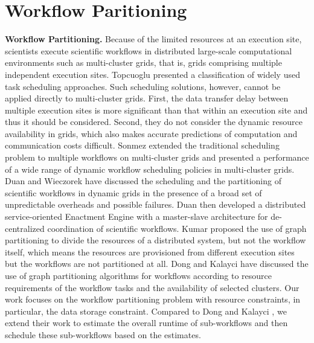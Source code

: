 \section{Workflow Paritioning}



\textbf{Workflow Partitioning.} Because of the limited resources at an execution site, scientists execute scientific workflows \cite{Bharathi2008, Rubing2005} in distributed large-scale computational environments such as multi-cluster grids, that is, grids comprising multiple independent execution sites. Topcuoglu \cite{Topcuoglu2002} presented a classification of widely used task scheduling approaches. Such scheduling solutions, however, cannot be applied directly to multi-cluster grids. First, the data transfer delay between multiple execution sites is more significant than that within an execution site and thus it should be considered. Second, they do not consider the dynamic resource availability in grids, which also makes accurate predictions of computation and communication costs difficult. Sonmez \cite{Sonmez2010} extended the traditional scheduling problem to multiple workflows on multi-cluster grids and presented a performance of a wide range of dynamic workflow scheduling policies in multi-cluster grids. Duan \cite{Rubing2005} and Wieczorek \cite{Wieczorek2005} have discussed the scheduling and the partitioning of scientific workflows in dynamic grids in the presence of a broad set of unpredictable overheads and possible failures. Duan \cite{Rubing2005} then developed a distributed service-oriented Enactment Engine with a master-slave architecture for de-centralized coordination of scientific workflows. Kumar \cite{Kumar2002} proposed the use of graph partitioning to divide the resources of a distributed system, but not the workflow itself, which means the resources are provisioned from different execution sites but the workflows are not partitioned at all. Dong \cite{Dong2007} and Kalayci \cite{Kalayci2010} have discussed the use of graph partitioning algorithms for workflows according to resource requirements of the workflow tasks and the availability of selected clusters. Our work focuses on the workflow partitioning problem with resource constraints, in particular, the data storage constraint. Compared to Dong \cite{Dong2007} and Kalayci \cite{Kalayci2010}, we extend their work to estimate the overall runtime of sub-workflows and then schedule these sub-workflows based on the estimates. 



